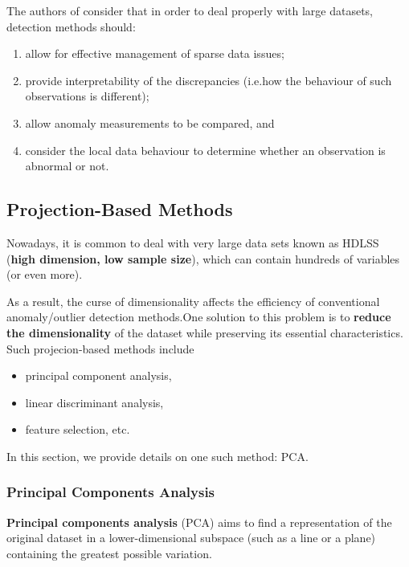 \noindent The authors of \cite{AYU} consider that in order to deal properly with large datasets, detection methods should:
\begin{enumerate}[noitemsep]
\item allow for effective management of sparse data issues;
\item provide interpretability of the discrepancies (i.e.\@ how the behaviour of such observations is different);
\item allow anomaly measurements to be compared, and 
\item consider the local data behaviour to determine whether an observation is abnormal or not.
\end{enumerate}
%
\subsection{Projection-Based Methods}
Nowadays, it is common to deal with very large data sets known as HDLSS (\textbf{high dimension, low sample size}), which can contain hundreds of variables (or even more). \par As a result,  the curse of dimensionality affects the efficiency of conventional anomaly/outlier detection methods.\newl One solution to this problem is to \textbf{reduce the dimensionality} of the dataset while preserving its essential characteristics. Such projecion-based methods include \begin{itemize}[noitemsep]\item principal component analysis, \item linear discriminant analysis, \item feature selection, etc. \end{itemize} In this section, we provide details on one such method: PCA.
\subsubsection*{Principal Components Analysis}
%
\textbf{Principal components analysis} (PCA) aims to find a representation of the original dataset in a lower-dimensional subspace (such as a line or a plane)  containing the greatest possible variation. 

